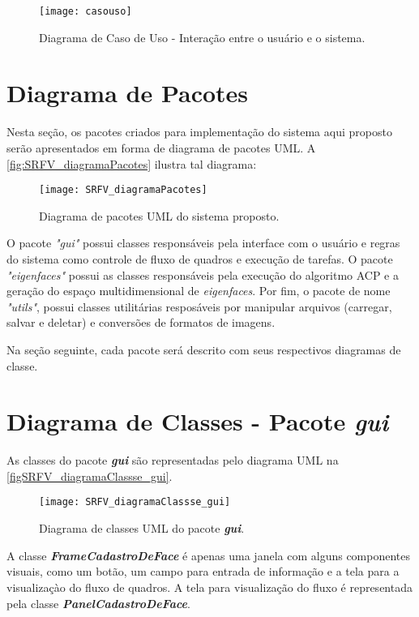 \begin{figure}[h]
	\centering
	\texttt{[image: casouso]}
	\caption{Diagrama de Caso de Uso - Interação entre o usuário e o sistema.}
	\label{casouso}
\end{figure}



\section{Diagrama de Pacotes}\label{sec:diagpacs}
Nesta seção, os pacotes criados para implementação do sistema aqui proposto serão apresentados em forma de diagrama de pacotes UML. A \autoref{fig:SRFV_diagramaPacotes} ilustra tal diagrama:

\begin{figure}[h]
	\centering
	\texttt{[image: SRFV\_diagramaPacotes]}
	\caption{Diagrama de pacotes UML do sistema proposto.}
	\label{fig:SRFV_diagramaPacotes}
\end{figure}

O pacote \textit{"gui"} possui classes responsáveis pela interface com o usuário e regras do sistema como controle de fluxo de quadros e execução de tarefas. O pacote \textit{"eigenfaces"} possui as classes responsáveis pela execução do algoritmo ACP e a geração do espaço multidimensional de \textit{eigenfaces}. Por fim, o pacote de nome \textit{"utils"}, possui classes utilitárias resposáveis por manipular arquivos (carregar, salvar e deletar) e conversões de formatos de imagens. 

Na seção seguinte, cada pacote será descrito com seus respectivos diagramas de classe.

\section{Diagrama de Classes - Pacote \textit{\textbf{gui}}}\label{sec:diagclasses}
As classes do pacote \textbf{\textit{gui}} são representadas pelo diagrama UML na \autoref{figSRFV_diagramaClassse_gui}.

\begin{figure}[h]
	\centering
	\texttt{[image: SRFV\_diagramaClassse\_gui]}
	\caption{Diagrama de classes UML do pacote \textbf{\textit{gui}}.}
	\label{figSRFV_diagramaClassse_gui}
\end{figure}

A classe \textbf{\textit{FrameCadastroDeFace}} é apenas uma janela com alguns componentes visuais, como um botão, um campo para entrada de informação e a tela para a visualizaçào do fluxo de quadros. A tela para visualização do fluxo é representada pela classe \textbf{\textit{PanelCadastroDeFace}}.

